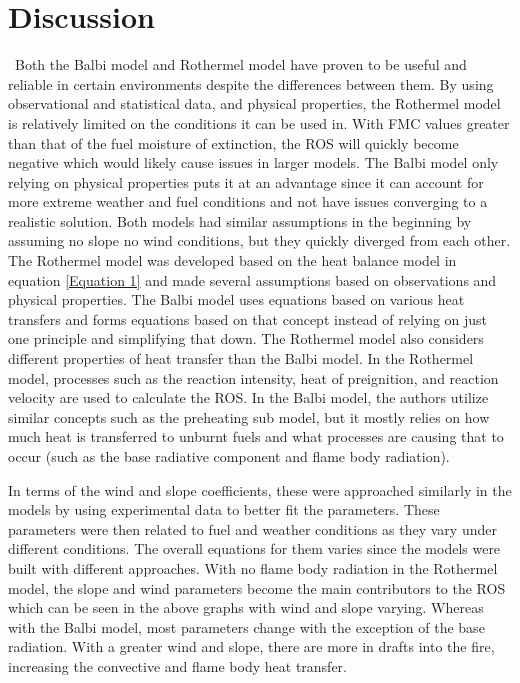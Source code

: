 \documentclass{article}
\begin{document}
\section{Discussion}

 Both the Balbi model and Rothermel model have proven to be useful and reliable in certain environments despite the differences between them. By using observational and statistical data, and physical properties, the Rothermel model is relatively limited on the conditions it can be used in. With FMC values greater than that of the fuel moisture of extinction, the ROS will quickly become negative which would likely cause issues in larger models. The Balbi model only relying on physical properties puts it at an advantage since it can account for more extreme weather and fuel conditions and not have issues converging to a realistic solution. Both models had similar assumptions in the beginning by assuming no slope no wind conditions, but they quickly diverged from each other. The Rothermel model was developed based on the heat balance model in equation \ref{Equation 1} and made several assumptions based on observations and physical properties. The Balbi model uses equations based on various heat transfers and forms equations based on that concept instead of relying on just one principle and simplifying that down. The Rothermel model also considers different properties of heat transfer than the Balbi model. In the Rothermel model, processes such as the reaction intensity, heat of preignition, and reaction velocity are used to calculate the ROS. In the Balbi model, the authors utilize similar concepts such as the preheating sub model, but it mostly relies on how much heat is transferred to unburnt fuels and what processes are causing that to occur (such as the base radiative component and flame body radiation).

In terms of the wind and slope coefficients, these were approached similarly in the models by using experimental data to better fit the parameters. These parameters were then related to fuel and weather conditions as they vary under different conditions. The overall equations for them varies since the models were built with different approaches. With no flame body radiation in the Rothermel model, the slope and wind parameters become the main contributors to the ROS which can be seen in the above graphs with wind and slope varying. Whereas with the Balbi model, most parameters change with the exception of the base radiation. With a greater wind and slope, there are more in drafts into the fire, increasing the convective and flame body heat transfer. 
\end{document}
